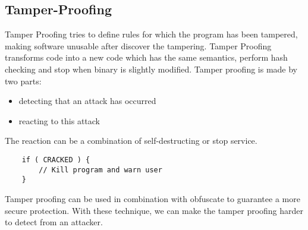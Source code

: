 \subsection{Tamper-Proofing}

Tamper Proofing tries to define rules for which the program has been tampered, making software unusable after discover the tampering.\newline 
Tamper Proofing transforms code into a new code which has the same semantics, perform hash checking and stop when binary is slightly modified. 
Tamper proofing is made by two parts: 
\begin{itemize}
    \item detecting that an attack has occurred
    \item reacting to this attack
\end{itemize}
\par
The reaction can be a combination of self-destructing or stop service. 

\begin{lstlisting}
    if ( CRACKED ) {
        // Kill program and warn user
    }
\end{lstlisting}
\par 
Tamper proofing can be used in combination with obfuscate to guarantee a more secure protection. With these technique, we can make the tamper proofing harder to detect from an attacker. 